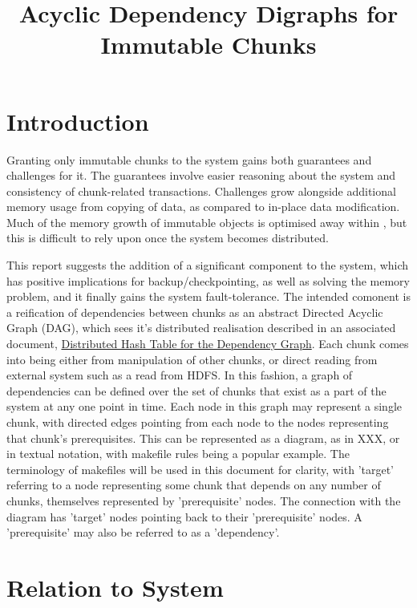 \documentclass[10pt, a4paper]{article}
\begin{document}
\title{Acyclic Dependency Digraphs for Immutable Chunks}
  
\maketitle

\section{Introduction}
Granting only immutable chunks to the \lsr{} system gains both guarantees and challenges for it.
The guarantees involve easier reasoning about the system and consistency of chunk-related transactions\cite{goetz2006java}.
Challenges grow alongside additional memory usage from copying of data, as compared to in-place data modification.
Much of the memory growth of immutable objects is optimised away within \R{}, but this is difficult to rely upon once the system becomes distributed\cite{rcore2020lang}.

This report suggests the addition of a significant component to the \lsr{} system, which has positive implications for backup/checkpointing, as well as solving the memory problem, and it finally gains the system fault-tolerance.
The intended comonent is a reification of dependencies between chunks as an abstract Directed Acyclic Graph (DAG), which sees it's distributed realisation described in an associated document, \href{https://www.japeca.com/dhtinfo.pdf}{Distributed Hash Table for the Dependency Graph}.
Each chunk comes into being either from manipulation of other chunks, or direct reading from external system such as a read from HDFS.
In this fashion, a graph of dependencies can be defined over the set of chunks that exist as a part of the system at any one point in time.
Each node in this graph may represent a single chunk, with directed edges pointing from each node to the nodes representing that chunk's prerequisites.
This can be represented as a diagram, as in XXX, or in textual notation, with makefile rules being a popular example\cite{shal2009build}.
The terminology of makefiles will be used in this document for clarity, with 'target' referring to a node representing some chunk that depends on any number of chunks, themselves represented by 'prerequisite' nodes. 
The connection with the diagram has 'target' nodes pointing back to their 'prerequisite' nodes.
A 'prerequisite' may also be referred to as a 'dependency'.

\section{Relation to System}
\end{document}
